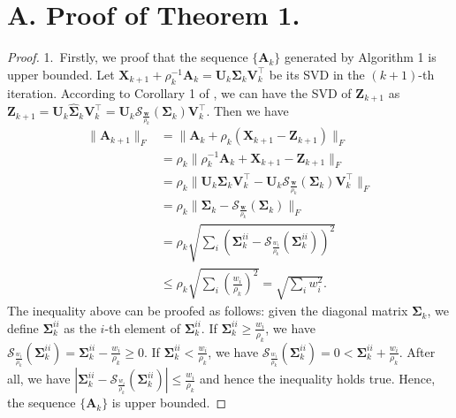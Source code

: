 \documentclass[10pt,twocolumn,letterpaper]{article}
\begin{document}
\section{A. Proof of Theorem 1.}
\begin{proof}
1.\ Firstly, we proof that the sequence $\{\mathbf{A}_{k}\}$ generated by Algorithm 1 is upper bounded.
Let $\mathbf{X}_{k+1}+\rho_{k}^{-1}\mathbf{A}_{k}
=
\mathbf{U}_{k}\mathbf{\Sigma}_{k}\mathbf{V}_{k}^{\top}$
be its SVD in the $(k+1)$-th iteration. According to Corollary 1 of \cite{wnnmijcv}, we can have the SVD of $\mathbf{Z}_{k+1}$ as $\mathbf{Z}_{k+1}=\mathbf{U}_{k}\hat{\mathbf{\Sigma}}_{k}\mathbf{V}_{k}^{\top}=\mathbf{U}_{k}\mathcal{S}_{\frac{\bm{w}}{\rho_{k}}}(\mathbf{\Sigma}_{k})\mathbf{V}_{k}^{\top}$. 
Then we have 
\begin{align}
\|
\mathbf{A}_{k+1}
\|_{F}
&
=
\|
\mathbf{A}_{k}
+
\rho_{k}
(\mathbf{X}_{k+1}-\mathbf{Z}_{k+1})
\|_{F}
\\
&
=
\rho_{k}\|
\rho_{k}^{-1}
\mathbf{A}_{k}
+
\mathbf{X}_{k+1}
-
\mathbf{Z}_{k+1}
\|_{F}
\\
&
=
\rho_{k}\|
\mathbf{U}_{k}\mathbf{\Sigma}_{k}\mathbf{V}_{k}^{\top}
-
\mathbf{U}_{k}\mathcal{S}_{\frac{\bm{w}}{\rho_{k}}}(\mathbf{\Sigma}_{k})\mathbf{V}_{k}^{\top}
\|_{F}
\\
&
=
\rho_{k}\|
\mathbf{\Sigma}_{k}
-
\mathcal{S}_{\frac{\bm{w}}{\rho_{k}}}(\mathbf{\Sigma}_{k})
\|_{F}
\\
&
=
\rho_{k}
\sqrt{\sum_{i}(\mathbf{\Sigma}_{k}^{ii}-\mathcal{S}_{\frac{w_{i}}{\rho_{k}}}(\mathbf{\Sigma}_{k}^{ii}))^{2}}
\\
&
\le
\rho_{k}
\sqrt{\sum_{i}(\frac{w_{i}}{\rho_{k}})^{2}}
=
\sqrt{\sum_{i}w_{i}^{2}}.
\end{align}
The inequality above can be proofed as follows: given the diagonal matrix $\mathbf{\Sigma}_{k}$, we define $\mathbf{\Sigma}_{k}^{ii}$ as the $i$-th element of $\mathbf{\Sigma}_{k}^{ii}$. If $\mathbf{\Sigma}_{k}^{ii}\ge\frac{w_{i}}{\rho_{k}}$, we have $\mathcal{S}_{\frac{w_{i}}{\rho_{k}}}(\mathbf{\Sigma}_{k}^{ii})=\mathbf{\Sigma}_{k}^{ii}-\frac{w_{i}}{\rho_{k}}\ge 0$. If $\mathbf{\Sigma}_{k}^{ii}<\frac{w_{i}}{\rho_{k}}$, we have $\mathcal{S}_{\frac{w_{i}}{\rho_{k}}}(\mathbf{\Sigma}_{k}^{ii})=0<\mathbf{\Sigma}_{k}^{ii}+\frac{w_{i}}{\rho_{k}}$. After all, we have $|\mathbf{\Sigma}_{k}^{ii}-\mathcal{S}_{\frac{w_{i}}{\rho_{k}}}(\mathbf{\Sigma}_{k}^{ii})|\le\frac{w_{i}}{\rho_{k}}$ and hence the inequality holds true. Hence, the sequence $\{\mathbf{A}_{k}\}$ is upper bounded.


\end{proof}
\end{document}
